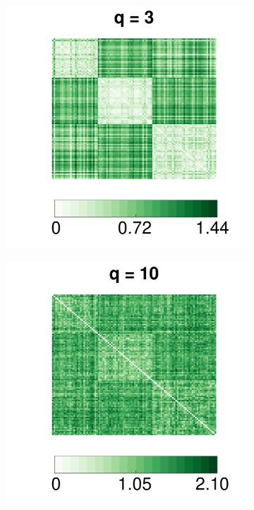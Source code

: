 \documentclass[12pt]{article}
\theoremstyle{definition}
\begin{document}
\begin{figure}[!ht]
\begin{subfigure}[b]{0.23\textwidth}
			\includegraphics[width=\textwidth]{../Figure/E3.pdf}
			\caption{}
			\label{fig:e3}
		\end{subfigure}
		\begin{subfigure}[b]{0.23\textwidth}
			\includegraphics[width=\textwidth]{../Figure/E10.pdf}

\end{subfigure}
\end{figure}
\end{document}
